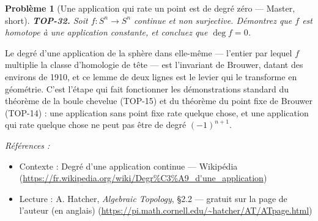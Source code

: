 \documentclass[11pt]{article}
\newtheorem{problem}{Problème}
\newenvironment{refs}{\par\small\noindent\emph{Références :}\begin{itemize}\setlength\itemsep{0pt}}{\end{itemize}\normalsize}
\begin{document}
\bigskip

\begin{problem}[{Une application qui rate un point est de degré zéro --- Master, short}]
\textbf{TOP-32.} Soit $ f : S^n \to S^n $ continue et non surjective. Démontrez
que $ f $ est homotope à une application constante, et concluez que $ \deg f = 0 $.
\end{problem}

\noindent Le degré d'une application de la sphère dans elle-même --- l'entier par lequel $ f $
multiplie la classe d'homologie de tête --- est l'invariant de Brouwer, datant des environs de 1910, et ce
lemme de deux lignes est le levier qui le transforme en géométrie. C'est l'étape qui fait fonctionner les
démonstrations standard du théorème de la boule chevelue (TOP-15) et du théorème du point fixe de Brouwer
(TOP-14) : une application sans point fixe rate quelque chose, et une application qui rate quelque chose ne
peut pas être de degré $ (-1)^{n+1} $.

\begin{refs}
\item Contexte : Degré d'une application continue --- Wikipédia (\url{https://fr.wikipedia.org/wiki/Degr%C3%A9_d'une_application})
\item Lecture : A. Hatcher, \textit{Algebraic Topology}, \S{}2.2 --- gratuit sur la page de l'auteur (en anglais) (\url{https://pi.math.cornell.edu/~hatcher/AT/ATpage.html})
\end{refs}

\bigskip
\end{document}
